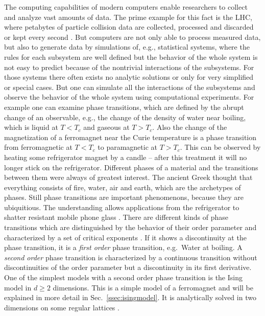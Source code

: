 The computing capabilities of modern computers enable researchers to
collect and analyze vast amounts of data. The prime example for this fact
is the LHC, where petabytes of particle collision data are collected,
processed and discarded or kept every second \cite{LHC}.
But computers are not only able to process measured data, but
also to generate data by simulations of, e.g., statistical systems, where
the rules for each subsystem are well defined but the behavior of the
whole system is not easy to predict because of the nontrivial interactions of the
subsystems. For those systems there often exists no analytic solutions
or only for very simplified or special cases. But one can simulate all
the interactions of the subsystems and observe the behavior of the whole
system using computational experiments.
For example one can examine phase transitions, which are defined by the abrupt
change of an observable, e.g., the change of the density of water near
boiling, which is liquid at \(T < T_c\) and gaseous at \(T > T_c\). Also
the change of the magnetization of a ferromagnet near the Curie temperature
is a phase transition from ferromagnetic at \(T < T_c\) to paramagnetic at \(T > T_c\).
This can be observed by heating some refrigerator magnet by a candle --
after this treatment it will no longer stick on the refrigerator.
Different phases of a material and the transitions between them were
always of greatest interest. The ancient Greek thought that everything
consists of fire, water, air and earth, which are the archetypes of
phases. Still phase transitions are important phenomenons, because they
are ubiquitious. The understanding allows applications from the
refrigerator to shatter resistant mobile phone glass \cite{PJournalGlass}.
There are different kinds of phase transitions which are distinguished by
the behavior of their order parameter and characterized by a set of
critical exponents \cite{yeomans}. If it shows a discontinuity at
the phase transition, it is a \emph{first order} phase transition, e.g.\ Water at boiling.
A \emph{second order} phase transition is characterized by a continuous
transition without discontinuities of the order parameter but a discontinuity
in its first derivative.\\
One of the simplest models with a second order phase transition is the
Ising model \cite{Ising1925} in \(d \ge 2\) dimensions. This is a simple
model of a ferromagnet and will be explained in more detail in Sec.\
\ref{ssec:isingmodel}. It is analytically solved in two dimensions on
some regular lattices \cite{Onsager1944} \cite{Wannier1945}.
